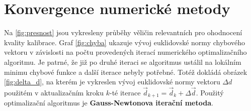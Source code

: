 \documentclass[twoside]{article}
\begin{document}
\section{Konvergence numerické metody}

Na \ref{fig:presnost} jsou vykresleny průběhy věličin relevantních pro ohodnocení kvality kalibrace.
Graf \ref{fig:chyba} ukazuje vývoj euklidovské normy chybového vektoru v závislosti na počtu provedených iterací numerického optimalizačního algoritmu.
Je patrné, že již po druhé iteraci se algoritmus ustálil na lokálním minimu chybové funkce a další iterace nebyly potřebné.
Totéž dokládá obrázek \ref{fig:delta_d}, na kterém je vykreslen vývoj euklidovské normy vektoru $\Delta d$ použitém v aktualizačním kroku $k$-té iterace $\vec{d}_{k+1} = \vec{d}_{k} + \Delta \vec{d}$.
Použitý optimalizační algoritmus je \textbf{Gauss-Newtonova iterační metoda}.
\end{document}
